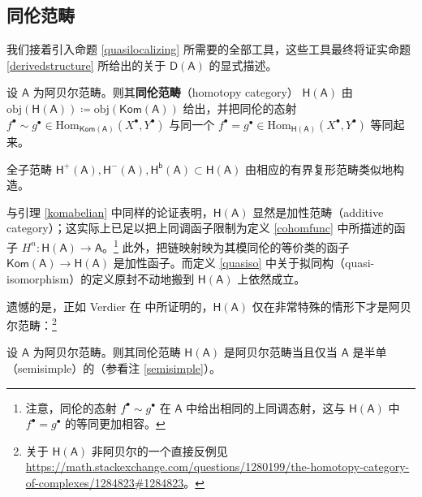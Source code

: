 \subsection{同伦范畴}\label{ch2.4}


我们接着引入命题 \ref{quasilocalizing} 所需要的全部工具，这些工具最终将证实命题 \ref{derivedstructure} 所给出的关于 $\mathsf{D(A)}$ 的显式描述。

\begin{Def}
	设 $\mathsf{A}$ 为阿贝尔范畴。则其\textbf{同伦范畴}（homotopy category） $\mathsf{H(A)}$ 由 $\text{obj}(\mathsf{H(A)})\coloneqq\text{obj}(\mathsf{Kom(A)})$ 给出，并把同伦的态射 $f^\bullet\sim g^\bullet\in\text{Hom}_{\mathsf{Kom(A)}}(X^\bullet, Y^\bullet)$ 与同一个 $f^\bullet=g^\bullet\in\text{Hom}_{\mathsf{H(A)}}(X^\bullet, Y^\bullet)$ 等同起来。
	
	全子范畴 $\mathsf{H^+(A)}, \mathsf{H^-(A)}, \mathsf{H^b(A)}\subset\mathsf{H(A)}$ 由相应的有界复形范畴类似地构造。
\end{Def}

与引理 \ref{komabelian} 中同样的论证表明，$\mathsf{H(A)}$ 显然是加性范畴（additive category）；这实际上已足以把上同调函子限制为定义 \ref{cohomfunc} 中所描述的函子 $H^n:\mathsf{H(A)}\rightarrow\mathsf{A}$。\footnote{注意，同伦的态射 $f^\bullet\sim g^\bullet$ 在 $\mathsf{A}$ 中给出相同的上同调态射，这与 $\mathsf{H(A)}$ 中 $f^\bullet=g^\bullet$ 的等同更加相容。} 此外，把链映射映为其模同伦的等价类的函子 $\mathsf{Kom(A)}\rightarrow\mathsf{H(A)}$ 是加性函子。而定义 \ref{quasiso} 中关于拟同构（quasi-isomorphism）的定义原封不动地搬到 $\mathsf{H(A)}$ 上依然成立。


遗憾的是，正如 Verdier 在 \cite[Proposition II.1.3.6]{[Ver96]} 中所证明的，$\mathsf{H(A)}$ 仅在非常特殊的情形下才是阿贝尔范畴：\footnote{关于 $\mathsf{H(A)}$ 非阿贝尔的一个直接反例见 \url{https://math.stackexchange.com/questions/1280199/the-homotopy-category-of-complexes/1284823\#1284823}。}

\begin{Lem}\label{whenD(A)abelian}
	设 $\mathsf{A}$ 为阿贝尔范畴。则其同伦范畴 $\mathsf{H(A)}$ 是阿贝尔范畴当且仅当 $\mathsf{A}$ 是半单（semisimple）的\textup（参看注 \ref{semisimple}\textup）。
\end{Lem}

